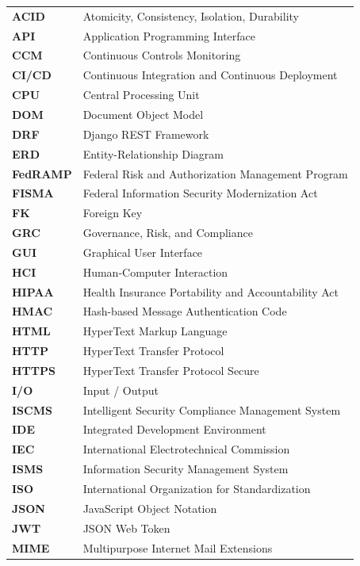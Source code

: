 \documentclass[11pt,a4paper,oneside,openright]{report}
\begin{document}
\renewcommand{\arraystretch}{1.2}
\begin{longtable}{@{}p{3cm} p{12cm}@{}}
\textbf{ACID} & Atomicity, Consistency, Isolation, Durability \\
\textbf{API} & Application Programming Interface \\
\textbf{CCM} & Continuous Controls Monitoring \\
\textbf{CI/CD} & Continuous Integration and Continuous Deployment \\
\textbf{CPU} & Central Processing Unit \\
\textbf{DOM} & Document Object Model \\
\textbf{DRF} & Django REST Framework \\
\textbf{ERD} & Entity-Relationship Diagram \\
\textbf{FedRAMP} & Federal Risk and Authorization Management Program \\
\textbf{FISMA} & Federal Information Security Modernization Act \\
\textbf{FK} & Foreign Key \\
\textbf{GRC} & Governance, Risk, and Compliance \\
\textbf{GUI} & Graphical User Interface \\
\textbf{HCI} & Human-Computer Interaction \\
\textbf{HIPAA} & Health Insurance Portability and Accountability Act \\
\textbf{HMAC} & Hash-based Message Authentication Code \\
\textbf{HTML} & HyperText Markup Language \\
\textbf{HTTP} & HyperText Transfer Protocol \\
\textbf{HTTPS} & HyperText Transfer Protocol Secure \\
\textbf{I/O} & Input / Output \\
\textbf{ISCMS} & Intelligent Security Compliance Management System \\
\textbf{IDE} & Integrated Development Environment \\
\textbf{IEC} & International Electrotechnical Commission \\
\textbf{ISMS} & Information Security Management System \\
\textbf{ISO} & International Organization for Standardization \\
\textbf{JSON} & JavaScript Object Notation \\
\textbf{JWT} & JSON Web Token \\
\textbf{MIME} & Multipurpose Internet Mail Extensions \\

\end{longtable}
\end{document}
